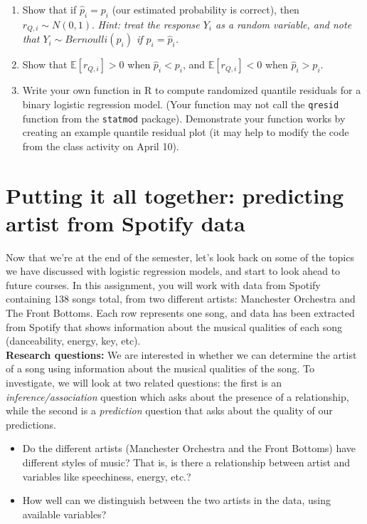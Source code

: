 \documentclass[11pt]{article}
\begin{document}
\begin{enumerate}
\item Show that if $\widehat{p}_i = p_i$ (our estimated probability is correct), then $r_{Q,i} \sim N(0, 1)$. \textit{Hint: treat the response $Y_i$ as a random variable, and note that $Y_i \sim Bernoulli(\widehat{p}_i)$ if $p_i = \widehat{p}_i$.}

\item Show that $\mathbb{E}[r_{Q,i}] > 0$ when $\widehat{p}_i < p_i$, and $\mathbb{E}[r_{Q,i}] < 0$ when $\widehat{p}_i > p_i$.

\item Write your own function in R to compute randomized quantile residuals for a binary logistic regression model. (Your function may not call the \texttt{qresid} function from the \texttt{statmod} package). Demonstrate your function works by creating an example quantile residual plot (it may help to modify the code from the class activity on April 10).
\end{enumerate}

\section*{Putting it all together: predicting artist from Spotify data}

Now that we're at the end of the semester, let's look back on some of the topics we have discussed with logistic regression models, and start to look ahead to future courses. In this assignment, you will work with data from Spotify containing 138 songs total, from two different artists: Manchester Orchestra and The Front Bottoms. Each row represents one song, and data has been extracted from Spotify that shows information about the musical qualities of each song (danceability, energy, key, etc).\\

\noindent \textbf{Research questions:} We are interested in whether we can determine the artist of a song using information about the musical qualities of the song. To investigate, we will look at two related questions: the first is an \textit{inference/association} question which asks about the presence of a relationship, while the second is a \textit{prediction} question that asks about the quality of our predictions.

\begin{itemize}
\item Do the different artists (Manchester Orchestra and the Front Bottoms) have different styles of music? That is, is there a relationship between artist and variables like speechiness, energy, etc.?

\item How well can we distinguish between the two artists in the data, using available variables?
\end{itemize} 
\end{document}
